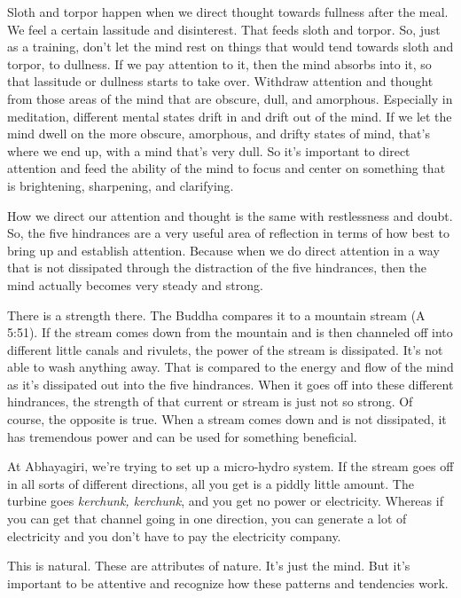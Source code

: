 Sloth and torpor happen when we direct thought towards fullness after
the meal. We feel a certain lassitude and disinterest. That feeds sloth
and torpor. So, just as a training, don’t let the mind rest on things
that would tend towards sloth and torpor, to dullness. If we pay
attention to it, then the mind absorbs into it, so that lassitude or
dullness starts to take over. Withdraw attention and thought from those
areas of the mind that are obscure, dull, and amorphous. Especially in
meditation, different mental states drift in and drift out of the mind.
If we let the mind dwell on the more obscure, amorphous, and drifty
states of mind, that’s where we end up, with a mind that’s very dull. So
it’s important to direct attention and feed the ability of the mind to
focus and center on something that is brightening, sharpening, and
clarifying.

How we direct our attention and thought is the same with restlessness
and doubt. So, the five hindrances are a very useful area of reflection
in terms of how best to bring up and establish attention. Because when
we do direct attention in a way that is not dissipated through the
distraction of the five hindrances, then the mind actually becomes very
steady and strong.

There is a strength there. The Buddha compares it to a mountain stream
(A 5:51). If the stream comes down from the mountain and is then
channeled off into different little canals and rivulets, the power of
the stream is dissipated. It’s not able to wash anything away. That is
compared to the energy and flow of the mind as it’s dissipated out into
the five hindrances. When it goes off into these different hindrances,
the strength of that current or stream is just not so strong. Of course,
the opposite is true. When a stream comes down and is not dissipated, it
has tremendous power and can be used for something beneficial.

At Abhayagiri, we’re trying to set up a micro-hydro system. If the
stream goes off in all sorts of different directions, all you get is a
piddly little amount. The turbine goes \emph{kerchunk, kerchunk}, and
you get no power or electricity. Whereas if you can get that channel
going in one direction, you can generate a lot of electricity and you
don’t have to pay the electricity company.

This is natural. These are attributes of nature. It’s just the mind. But
it’s important to be attentive and recognize how these patterns and
tendencies work.

